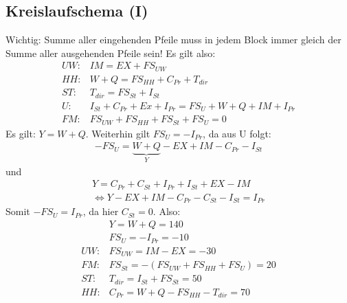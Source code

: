 \documentclass{scrartcl}
\begin{document}
\subsection{Kreislaufschema (I)}
Wichtig: Summe aller eingehenden Pfeile muss in jedem Block immer gleich der Summe aller ausgehenden Pfeile sein! Es gilt also:
\begin{align*}
  UW:& IM=EX+FS_{UW}\\
  HH:& W+Q = FS_{HH} + C_{Pr} + T_{dir}\\
  ST:& T_{dir} = FS_{St} + I_{St} \\
  U:& I_{St} + C_{Pr} + Ex + I_{Pr} = FS_{U} + W+Q + IM + I_{Pr}\\
  FM:& FS_{UW} + FS_{HH} + FS_{St} + FS_{U} = 0
\end{align*}
Es gilt: $Y=W+Q$. Weiterhin gilt $FS_U=-I_{Pr}$, da aus U folgt:
\begin{align*}
-FS_U = \underbrace{W+Q}_Y - EX + IM - C_{Pr} - I_{St}
\end{align*}
und
\begin{align*}
Y=C_{Pr}+C_{St}+I_{Pr}+I_{St}+EX-IM\\
\Leftrightarrow Y-EX+IM-C_{Pr}-C_{St}-I_{St} = I_{Pr}
\end{align*}
Somit $-FS_U = I_{Pr}$, da hier $C_{St}=0$. Also:
\begin{align*}
  &Y=W+Q=140\\
  &FS_U = - I_{Pr} = -10\\
  UW:& FS_{UW} = IM-EX = -30\\
  FM:& FS_{St} = - (FS_{UW}+FS_{HH}+FS_U) = 20\\
  ST:& T_{dir} = I_{St} + FS_{St} = 50\\
  HH:& C_{Pr} = W+Q - FS_{HH}-T_{dir} = 70
\end{align*}
\end{document}

